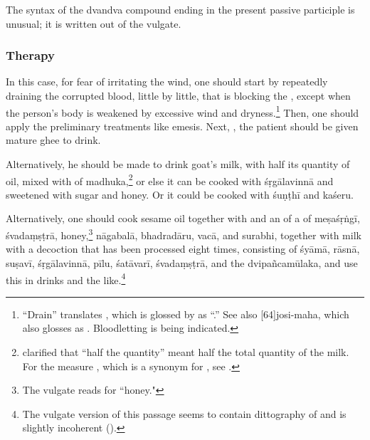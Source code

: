 \begin{translation}
{        The syntax of the dvandva compound ending in the present
        passive participle
         is unusual; it is written out of the
        vulgate.}

    \subsubsection{Therapy}
    \item[7]

    In this case, for fear of irritating the wind, one should start by
    repeatedly draining the corrupted blood, little by little, that is
    blocking the ,  except when the person's
    body is
    weakened by excessive wind and dryness.\footnote{“Drain”
        translates
        , which is glossed by  as
        “.” See also [64]{josi-maha}, which
        also
        glosses  as .  Bloodletting
        is being
        indicated.} Then, one should apply the preliminary treatments
    like
    emesis.  Next, ,
    the patient
    should be given mature ghee to drink.

    Alternatively, he should be made to drink goat's milk, with half
    its
    quantity of oil, mixed with  of
    \gls{madhuka},\footnote{ clarified that
        “half the
        quantity” meant half the total quantity of the milk. For the
        measure
        , which is a synonym for , see
        \cite[263]{wuja-2003}.}  or else it can be cooked with
    \gls{śṛgālavinnā} and sweetened with sugar and honey. Or
    it could be
    cooked with \gls{śuṇṭhī} and \gls{kaśeru}.

    Alternatively, one should cook sesame oil together with and
    an
     of a  of
    \gls{meṣaśṛṅgī},
    \gls{śvadaṃṣṭrā}, honey,\footnote{The vulgate reads
         for
        “honey."} \gls{nāgabalā}, \gls{bhadradāru}, \gls{vacā},
    and
    \gls{surabhi},
    together with milk with a decoction that has been
    processed eight
    times, consisting of \gls{śyāmā}, \gls{rāsnā},
    \gls{suṣavī},
    \gls{śṛgālavinnā}, \gls{pīlu}, \gls{śatāvarī},
    \gls{śvadaṃṣṭrā}, and
    the \gls{dvipañcamūlaka}, and use this in drinks and the
    like.\footnote{The vulgate version of this passage seems
        to contain
        dittography of  and is slightly
        incoherent
        (\cite[424]{vulgate}).}


\end{translation}
